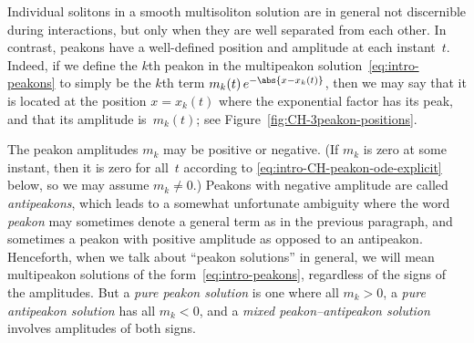 \documentclass[10pt,a4paper]{article} \pdfoutput=1 
\begin{document}
Individual solitons in a smooth multisoliton solution are in general
not discernible during interactions,
but only when they are well separated from each other.
In contrast, peakons have a well-defined position and amplitude at each instant~$t$.
Indeed, if we define the $k$th peakon in the multi\-peakon solution~\eqref{eq:intro-peakons}
to simply be the $k$th term $m_k(t) \, e^{-\abs{x-x_k(t)}}$,
then we may say that it is located at the position $x=x_k(t)$
where the exponential factor has its peak,
and that its amplitude is~$m_k(t)$;
see Figure~\ref{fig:CH-3peakon-positions}.

The peakon amplitudes $m_k$ may be positive or negative.
(If $m_k$ is zero at some instant, then it is zero for all~$t$ according to
\eqref{eq:intro-CH-peakon-ode-explicit} below, so we may assume $m_k \neq 0$.)
Peakons with negative amplitude
are called \emph{antipeakons}, which leads to a somewhat unfortunate ambiguity where the word
\emph{peakon} may sometimes denote a general term as in the previous paragraph,
and sometimes a peakon with positive amplitude as opposed to an antipeakon.
Henceforth, when we talk about ``peakon solutions'' in general, we will mean multi\-peakon
solutions of the form~\eqref{eq:intro-peakons}, regardless of the signs of the amplitudes.
But a \emph{pure peakon solution} is one where all $m_k > 0$,
a  \emph{pure antipeakon solution} has all $m_k < 0$,
and a \emph{mixed peakon--antipeakon solution} involves amplitudes of both signs.
\end{document}
